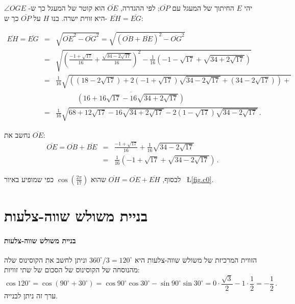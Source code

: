 \documentclass[11pt,a4paper]{article}
\newenvironment{form}[1]{%
\begin{displaymath}%
\renewcommand{\arraystretch}{#1}%
\begin{array}{lcl}}%
{\end{array}%
\end{displaymath}%
}
\newcommand*{\disfrac}[2]{\displaystyle\frac{#1}{#2}}
\begin{document}
יהי
$E$
החיתוך של המעגל עם
$\overline{OP}$;
לפי ההגדרה,
$\overline{OE}$
הוא קוטר של המעגל כך ש-%
$\angle OGE$
היא זווית ישרה.
בנו
$H$
על
$\overline{OP}$
כך ש-%
$\overline{EH}=\overline{EG}$:

\begin{form}{2}
\overline{EH}=\overline{EG}&=&\sqrt{\overline{OE}^2-\overline{OG}^2}=\sqrt{(\overline{OB}+\overline{BE})^2-\overline{OG}^2}\\
&=&\sqrt{\left(\disfrac{-1+\sqrt{17}}{16}+\disfrac{\sqrt{34-2\sqrt{17}}}{16}\right)^2-
\disfrac{1}{16}\left(-1-\sqrt{17}+\sqrt{34+2\sqrt{17}}\right)}
\\
&=&\disfrac{1}{16}\sqrt{\left(
(18-2\sqrt{17})+ 2(-1+\sqrt{17})\sqrt{34-2\sqrt{17}}+
(34-2\sqrt{17})\right)+}\\
&&\quad\quad\quad\overline{
\left(16+16\sqrt{17}-16\sqrt{34+2\sqrt{17}}\right)}\\
&=&\disfrac{1}{16}\sqrt{
68+12\sqrt{17}-16\sqrt{34+2\sqrt{17}}-2(1-\sqrt{17})\sqrt{34-2\sqrt{17}}
}\,.
\end{form}

נחשב את
$\overline{OE}$:
\begin{form}{2}
\overline{OE}=\overline{OB}+\overline{BE}&=&\disfrac{-1+\sqrt{17}}{16}+\disfrac{1}{16}\sqrt{34-2\sqrt{17}}\\
&=&\disfrac{1}{16}\left(-1+\sqrt{17}+\sqrt{34-2\sqrt{17}}\right)\,.
\end{form}

לבסוף,
$\overline{OH}=\overline{OE}+\overline{EH}$
שהוא
$\cos \left(\disfrac{2\pi}{17}\right)$
כפי שמופיע באיור~%
\L{\ref{fig.c0}}.

\newpage

\appendix
\section{בניית משולש שווה-צלעות}\label{a.triangle}


\paragraph{בניית משולש שווה-צלעות}
הזווית המרכיזת של משולש שווה-צלעות היא
$360^\circ/3=120^\circ$ 
וניתן לחשב את הקוסינוס שלה מהנוסחה של הקוסינוס של הסכום של שתי זוויות:
\[
\cos 120^\circ = \cos(90^\circ+30^\circ)=\cos 90^\circ \cos 30^\circ  -\sin 90^\circ \sin 30^\circ = 0\cdot \frac{\sqrt{3}}{2} - 1\cdot \frac{1}{2}=-\disfrac{1}{2}\,.
\]
ערך זה ניתן לבנייה.
\end{document}
